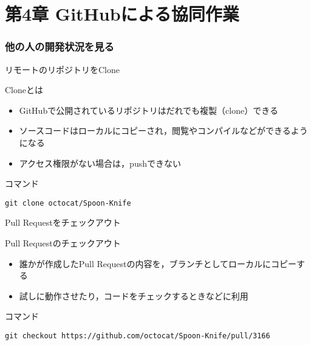 \documentclass[t, aspectratio=169]{beamer}
\begin{document}
\part{第4章 GitHubによる協同作業}
\label{sec-4}
\section{他の人の開発状況を見る}
\label{sec-4-1}
\begin{frame}[fragile,label=sec-4-1-1]{リモートのリポジトリをClone}
 \begin{block}{Cloneとは}
\begin{itemize}
\item GitHubで公開されているリポジトリはだれでも複製（clone）できる
\item ソースコードはローカルにコピーされ，閲覧やコンパイルなどができるようになる
\item アクセス権限がない場合は，pushできない
\end{itemize}
\end{block}

\begin{block}{コマンド}
\begin{verbatim}
git clone octocat/Spoon-Knife
\end{verbatim}
\end{block}
\end{frame}
\begin{frame}[fragile,label=sec-4-1-2]{Pull Requestをチェックアウト}
 \begin{block}{Pull Requestのチェックアウト}
\begin{itemize}
\item 誰かが作成したPull Requestの内容を，ブランチとしてローカルにコピーする
\item 試しに動作させたり，コードをチェックするときなどに利用
\end{itemize}
\end{block}

\begin{block}{コマンド}
\begin{verbatim}
git checkout https://github.com/octocat/Spoon-Knife/pull/3166
\end{verbatim}
\end{block}
\end{frame}
\end{document}
